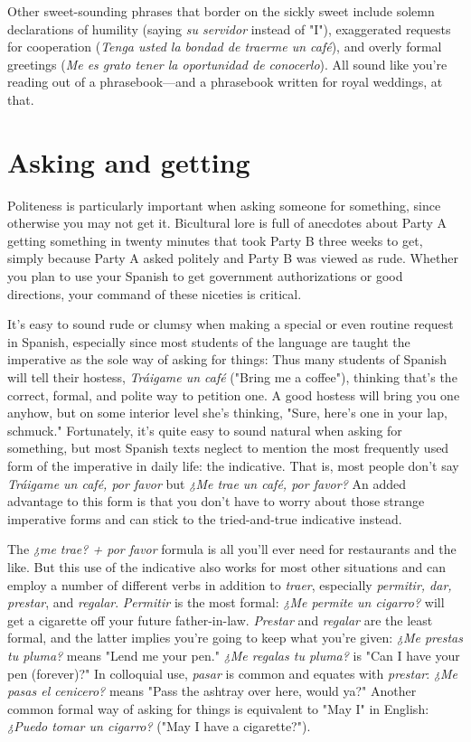 \documentclass[14pt,a4paper,oneside]{memoir}
\begin{document}
Other sweet-sounding phrases that border on the sickly sweet
include solemn declarations of humility (saying \emph{su servidor} instead of
"I"), exaggerated requests for cooperation (\emph{Tenga usted la bondad de
traerme un café}), and overly formal greetings (\emph{Me es grato tener la
oportunidad de conocerlo}). All sound like you're reading out of a
phrasebook---and a phrasebook written for royal weddings, at that.

\section{Asking and getting}

Politeness is particularly important when asking someone for
something, since otherwise you may not get it. Bicultural lore is full of
anecdotes about Party A getting something in twenty minutes that
took Party B three weeks to get, simply because Party A asked politely
and Party B was viewed as rude. Whether you plan to use your Spanish
to get government authorizations or good directions, your command of
these niceties is critical.

It's easy to sound rude or clumsy when making a special or
even routine request in Spanish, especially since most students of the
language are taught the imperative as the sole way of asking for things:
Thus many students of Spanish will tell their hostess, \emph{Tráigame un café} ("Bring me a coffee"), thinking that's the correct, formal, and polite way to petition one. A good hostess will bring you one anyhow,
but on some interior level she's thinking, "Sure, here's one in your lap,
schmuck." Fortunately, it's quite easy to sound natural when asking
for something, but most Spanish texts neglect to mention the most frequently used form of the imperative in daily life: the indicative. That
is, most people don't say \emph{Tráigame un café, por favor} but \emph{¿Me trae un
café, por favor?} An added advantage to this form is that you don't have
to worry about those strange imperative forms and can stick to the
tried-and-true indicative instead.

The \emph{¿me trae? + por favor} formula is all you'll ever need for
restaurants and the like. But this use of the indicative also works for
most other situations and can employ a number of different verbs in
addition to \emph{traer}, especially \emph{permitir, dar, prestar}, and \emph{regalar}. \emph{Permitir} is the most formal: \emph{¿Me permite un cigarro?} will get a cigarette off
your future father-in-law. \emph{Prestar} and \emph{regalar} are the least formal, and
the latter implies you're going to keep what you're given: \emph{¿Me prestas
tu pluma?} means "Lend me your pen." \emph{¿Me regalas tu pluma?} is "Can
I have your pen (forever)?" In colloquial use, \emph{pasar} is common and
equates with \emph{prestar}: \emph{¿Me pasas el cenicero?} means "Pass the ashtray
over here, would ya?" Another common formal way of asking for
things is equivalent to "May I" in English: \emph{¿Puedo tomar un cigarro?}
("May I have a cigarette?").
\end{document}

